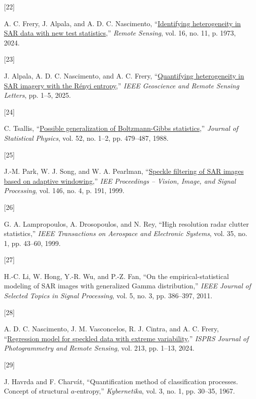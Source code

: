 \documentclass[
  lettersize  journal,
]{IEEEtran}%
\newlength{\cslhangindent}
\newlength{\csllabelwidth}
\newenvironment{CSLReferences}[2] %
 {\begin{list}{}{%
  \setlength{\itemindent}{0pt}
  \setlength{\leftmargin}{0pt}
  \setlength{\parsep}{0pt}
  \ifodd #1
   \setlength{\leftmargin}{\cslhangindent}
   \setlength{\itemindent}{-1\cslhangindent}
  \fi
  \setlength{\itemsep}{#2\baselineskip}}}
 {\end{list}}
\newcommand{\CSLLeftMargin}[1]{\parbox[t]{\csllabelwidth}{\strut#1\strut}}
\newcommand{\CSLRightInline}[1]{\parbox[t]{\linewidth - \csllabelwidth}{\strut#1\strut}}
\begin{document}
\begin{CSLReferences}{0}{0}
\CSLLeftMargin{{[}22{]} }%
\CSLRightInline{A. C. Frery, J. Alpala, and A. D. C. Nascimento,
{``\href{https://doi.org/10.3390/rs16111973}{Identifying heterogeneity
in {SAR} data with new test statistics},''} \emph{Remote Sensing}, vol.
16, no. 11, p. 1973, 2024. }

\CSLLeftMargin{{[}23{]} }%
\CSLRightInline{J. Alpala, A. D. C. Nascimento, and A. C. Frery,
{``\href{https://doi.org/10.1109/lgrs.2025.3581855}{Quantifying
heterogeneity in SAR imagery with the {R}ényi entropy},''} \emph{IEEE
Geoscience and Remote Sensing Letters}, pp. 1--5, 2025. }

\CSLLeftMargin{{[}24{]} }%
\CSLRightInline{C. Tsallis,
{``\href{https://doi.org/10.1007/bf01016429}{Possible generalization of
{B}oltzmann-{G}ibbs statistics},''} \emph{Journal of Statistical
Physics}, vol. 52, no. 1--2, pp. 479--487, 1988. }

\CSLLeftMargin{{[}25{]} }%
\CSLRightInline{J.-M. Park, W. J. Song, and W. A. Pearlman,
{``\href{https://doi.org/10.1049/ip-vis:19990550}{Speckle filtering of
SAR images based on adaptive windowing},''} \emph{IEE Proceedings --
Vision, Image, and Signal Processing}, vol. 146, no. 4, p. 191, 1999. }

\CSLLeftMargin{{[}26{]} }%
\CSLRightInline{G. A. Lampropoulos, A. Drosopoulos, and N. Rey, {``High
resolution radar clutter statistics,''} \emph{IEEE Transactions on
Aerospace and Electronic Systems}, vol. 35, no. 1, pp. 43--60, 1999. }

\CSLLeftMargin{{[}27{]} }%
\CSLRightInline{H.-C. Li, W. Hong, Y.-R. Wu, and P.-Z. Fan, {``On the
empirical-statistical modeling of {SAR} images with generalized {G}amma
distribution,''} \emph{IEEE Journal of Selected Topics in Signal
Processing}, vol. 5, no. 3, pp. 386--397, 2011. }

\CSLLeftMargin{{[}28{]} }%
\CSLRightInline{A. D. C. Nascimento, J. M. Vasconcelos, R. J. Cintra,
and A. C. Frery,
{``\href{https://doi.org/10.1016/j.isprsjprs.2024.05.009}{Regression
model for speckled data with extreme variability},''} \emph{ISPRS
Journal of Photogrammetry and Remote Sensing}, vol. 213, pp. 1--13,
2024. }

\CSLLeftMargin{{[}29{]} }%
\CSLRightInline{J. Havrda and F. Charvát, {``Quantification method of
classification processes. Concept of structural \(a\)-entropy,''}
\emph{Kybernetika}, vol. 3, no. 1, pp. 30--35, 1967. }


\end{CSLReferences}
\end{document}
